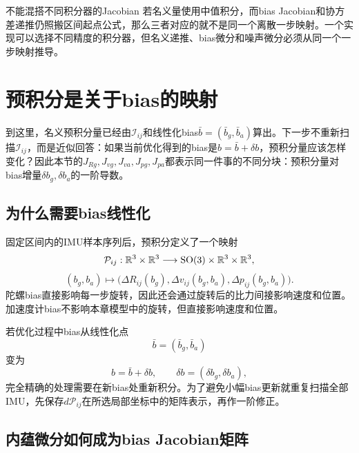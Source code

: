 \begin{imucase}{不能混搭不同积分器的Jacobian}
若名义量使用中值积分，而bias Jacobian和协方差递推仍照搬区间起点公式，那么三者对应的就不是同一个离散一步映射。一个实现可以选择不同精度的积分器，但名义递推、bias微分和噪声微分必须从同一个一步映射推导。
\end{imucase}


\section{预积分是关于bias的映射}

到这里，名义预积分量已经由$\mathcal I_{ij}$和线性化bias$\bar b=(\bar b_g,\bar b_a)$算出。下一步不重新扫描$\mathcal I_{ij}$，而是近似回答：如果当前优化得到的bias是$b=\bar b+\delta b$，预积分量应该怎样变化？因此本节的$J_{R g},J_{v g},J_{v a},J_{p g},J_{p a}$都表示同一件事的不同分块：预积分量对bias增量$\delta b_g,\delta b_a$的一阶导数。

\subsection{为什么需要bias线性化}

固定区间内的IMU样本序列后，预积分定义了一个映射
\[
    \mathcal P_{ij}:
    \mathbb{R}^3\times\mathbb{R}^3
    \longrightarrow
    \operatorname{SO}(3)\times\mathbb{R}^3\times\mathbb{R}^3,
\]
\[
    (b_g,b_a)
    \longmapsto
    \bigl(
        \Delta R_{ij}(b_g),
        \Delta v_{ij}(b_g,b_a),
        \Delta p_{ij}(b_g,b_a)
    \bigr).
\]
陀螺bias直接影响每一步旋转，因此还会通过旋转后的比力间接影响速度和位置。加速度计bias不影响本章模型中的旋转，但直接影响速度和位置。

若优化过程中bias从线性化点
\[
    \bar b=(\bar b_g,\bar b_a)
\]
变为
\[
    b=\bar b+\delta b,
    \qquad
    \delta b=(\delta b_g,\delta b_a),
\]
完全精确的处理需要在新bias处重新积分。为了避免小幅bias更新就重复扫描全部IMU，先保存$d\mathcal P_{ij}$在所选局部坐标中的矩阵表示，再作一阶修正。

\subsection{内蕴微分如何成为bias Jacobian矩阵}


